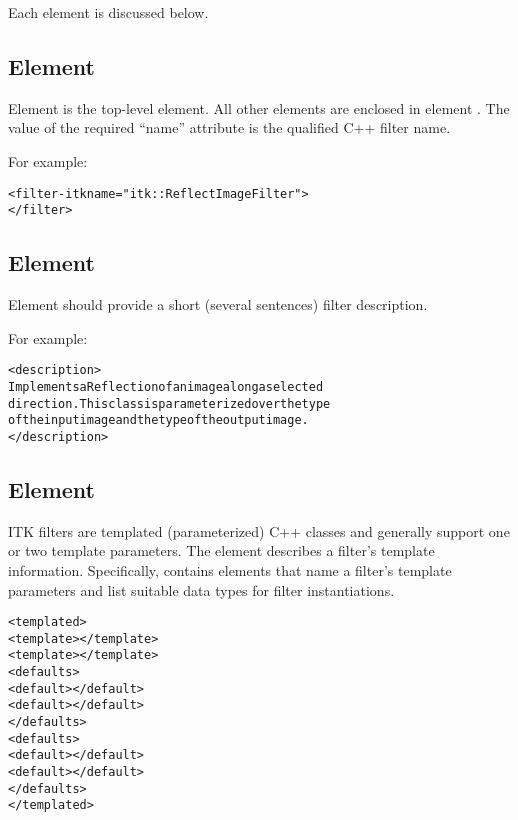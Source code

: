 Each element is discussed below.

\subsection{Element }
\label{sec:itk_mods:filter-itk_element}

Element  is the top-level element.  All other
elements are enclosed in element . The value
of the required ``name'' attribute is the qualified C++ filter name.

For example:

\begin{alltt}
  <filter-itk name="itk::ReflectImageFilter">
    \velide
  </filter>
\end{alltt}

\subsection{Element }
\label{sec:itk_mods:descr_element}

Element  should provide a short (several sentences)
filter description.  

For example:

\begin{alltt}
  <description>
    Implements a Reflection of an image along a selected 
    direction. This class is parameterized over the type 
    of the input image and the type of the output image. 
  </description>
\end{alltt}


\subsection{Element }
\label{sec:itk_mods:templated}

ITK filters are templated (parameterized) C++ classes and generally
support one or two template parameters.  The 
element describes a filter's template information.  Specifically, 
 contains elements that name a filter's
template parameters and list suitable data types for filter
instantiations.

\begin{alltt}
<templated>
  <template></template>
  <template></template>
  \velide 
  <defaults>
    <default></default>
    <default></default>
    \velide
  </defaults>
  <defaults>
    <default></default>
    <default></default>
    \velide
  </defaults>
  \velide
</templated>
\end{alltt}


